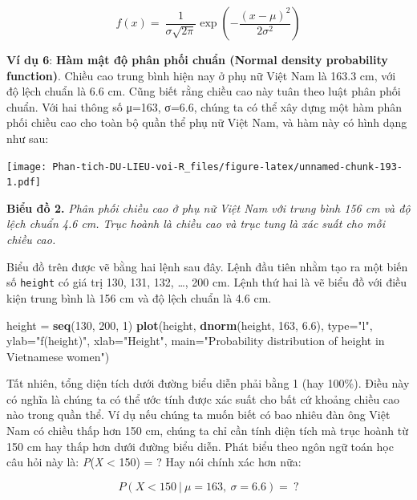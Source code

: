 \documentclass[
]{book}
\newenvironment{Shaded}{\begin{snugshade}}{\end{snugshade}}
\newcommand{\DataTypeTok}[1]{\textcolor[rgb]{0.13,0.29,0.53}{#1}}
\newcommand{\DecValTok}[1]{\textcolor[rgb]{0.00,0.00,0.81}{#1}}
\newcommand{\FloatTok}[1]{\textcolor[rgb]{0.00,0.00,0.81}{#1}}
\newcommand{\KeywordTok}[1]{\textcolor[rgb]{0.13,0.29,0.53}{\textbf{#1}}}
\newcommand{\NormalTok}[1]{#1}
\newcommand{\StringTok}[1]{\textcolor[rgb]{0.31,0.60,0.02}{#1}}
\begin{document}
\[f\left( x \right) = \ \frac{1}{\sigma\sqrt{2\pi}}\exp\left( - \frac{\left( x - \mu \right)^{2}}{2\sigma^{2}} \right)\]

\textbf{Ví dụ 6}: \textbf{Hàm mật độ phân phối chuẩn (Normal density probability function)}. Chiều cao trung bình hiện nay ở phụ nữ Việt Nam là 163.3 cm, với độ lệch chuẩn là 6.6 cm. Cũng biết rằng chiều cao này tuân theo luật phân phối chuẩn. Với hai thông số μ=163, σ=6.6, chúng ta có thể xây dựng một hàm phân phối chiều cao cho toàn bộ quần thể phụ nữ Việt Nam, và hàm này có hình dạng như sau:

\texttt{[image: Phan-tich-DU-LIEU-voi-R\_files/figure-latex/unnamed-chunk-193-1.pdf]}

\textbf{Biểu đồ 2.} \emph{Phân phối chiều cao ở phụ nữ Việt Nam với trung bình 156 cm và độ lệch chuẩn 4.6 cm. Trục hoành là chiều cao và trục tung là xác suất cho mỗi chiều cao.}

Biểu đồ trên được vẽ bằng hai lệnh sau đây. Lệnh đầu tiên nhằm tạo ra một biến số \texttt{height} có giá trị 130, 131, 132, \ldots, 200 cm. Lệnh thứ hai là vẽ biểu đồ với điều kiện trung bình là 156 cm và độ lệch chuẩn là 4.6 cm.

\begin{Shaded}
\begin{Highlighting}[]
\NormalTok{height =}\StringTok{ }\KeywordTok{seq}\NormalTok{(}\DecValTok{130}\NormalTok{, }\DecValTok{200}\NormalTok{, }\DecValTok{1}\NormalTok{)}
\KeywordTok{plot}\NormalTok{(height, }\KeywordTok{dnorm}\NormalTok{(height, }\DecValTok{163}\NormalTok{, }\FloatTok{6.6}\NormalTok{), }
       \DataTypeTok{type=}\StringTok{"l"}\NormalTok{, }
       \DataTypeTok{ylab=}\StringTok{"f(height)"}\NormalTok{,}
       \DataTypeTok{xlab=}\StringTok{"Height"}\NormalTok{,}
       \DataTypeTok{main=}\StringTok{"Probability distribution of height in Vietnamese women"}\NormalTok{)}
\end{Highlighting}
\end{Shaded}

Tất nhiên, tổng diện tích dưới đường biểu diễn phải bằng 1 (hay 100\%). Điều này có nghĩa là chúng ta có thể ước tính được xác suất cho bất cứ khoảng chiều cao nào trong quần thể. Ví dụ nếu chúng ta muốn biết có bao nhiêu đàn ông Việt Nam có chiều thấp hơn 150 cm, chúng ta chỉ cần tính diện tích mà trục hoành từ 150 cm hay thấp hơn dưới đường biểu diễn. Phát biểu theo ngôn ngữ toán học câu hỏi này là: \emph{P}(\emph{X} \textless{} 150) = ? Hay nói chính xác hơn nữa:

\[P\left( X < 150\ |\ \mu = 163,\ \sigma = 6.6 \right) = \ ?\]
\end{document}
